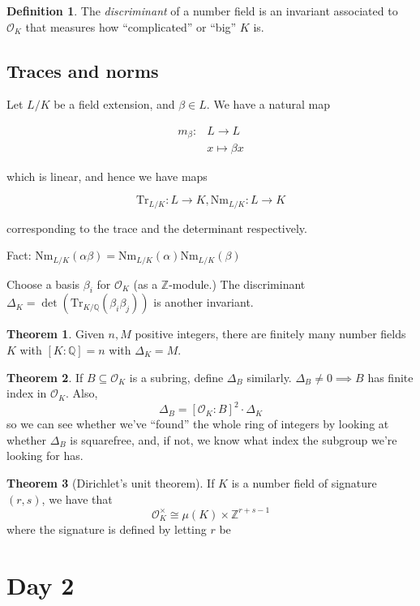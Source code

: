 \documentclass{article}
\newcommand{\Z}{\mathbb Z}
\newcommand{\Q}{\mathbb Q}
\newcommand{\ok}{\mathcal O_K}
\newcommand{\tr}[2][L/K]{\text{Tr}_{#1}(#2)}
\newcommand{\nm}[2][L/K]{\text{Nm}_{#1}(#2)}
\theoremstyle{definition}
\newtheorem*{thm}{Theorem}
\newtheorem*{defn}{Definition}
\begin{document}
\begin{defn}
 The \textit{discriminant} of a number field is an invariant associated to $\ok$
 that measures how ``complicated'' or ``big'' $K$ is. 
\end{defn}

\subsection{Traces and norms}
Let $L/K$ be a field extension, and $\beta\in L$. We have a natural map

\begin{align*}
  m_\beta : &L\to L \\
            &x\mapsto \beta x
\end{align*}

which is linear, and hence we have maps

$$\text{Tr}_{L/K}: L\to K, \text{Nm}_{L/K}: L\to K$$

corresponding to the trace and the determinant respectively.

Fact: $\nm {\alpha\beta} = \nm {\alpha} \nm{\beta}$

Choose a basis $\beta_i$ for $\ok$ (as a $\Z$-module.)
The discriminant $\Delta_K = \det({\tr [K/\Q] {\beta_i\beta_j}})$ is another invariant.

\begin{thm}
 Given $n, M$ positive integers, there are finitely many number fields $K$ with
 $[K:\Q] = n$ with $\Delta_K = M$. 
\end{thm}

\begin{thm}
  If $B\subseteq\ok$ is a subring, define $\Delta_B$ similarly.
  $\Delta_B\neq 0 \implies B$ has finite index in $\ok$. Also,
  $$\Delta_B = [\ok:B]^2\cdot\Delta_K$$
  so we can see whether we've ``found'' the whole ring of integers by looking at
  whether $\Delta_B$ is squarefree, and, if not, we know what index the subgroup
  we're looking for has. 
\end{thm}

\begin{thm}[Dirichlet's unit theorem]
  If $K$ is a number field of signature $(r,s)$, we have that
  $$\ok^{\times} \cong \mu(K) \times \Z^{r+s-1}$$
  where the signature is defined by letting $r$ be 
\end{thm}

\section{Day 2}
\end{document}
